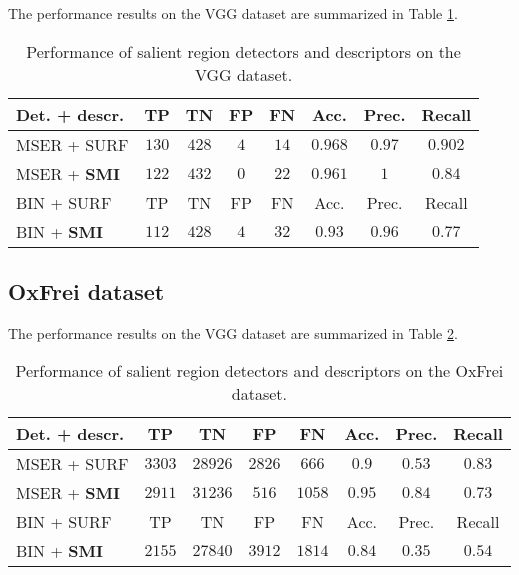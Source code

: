 \documentclass[a4paper,11pt]{article}
\begin{document}
The performance results on the VGG dataset are summarized in Table \ref{tab:vgg}.
\begin{table}[!ht]
\begin{center}
\begin{tabular}{|l||c|c|c|c|c|c|c|}

\hline
Det. + descr. & TP & TN & FP & FN & Acc. &Prec. &Recall\\
\hline
\hline
MSER + SURF & $130$ & $428$ & $4$ & $14$ & $0.968$ & $0.97$ & $0.902$\\
\hline
MSER + \bf{SMI} & $122$ & $432$ & $0$ & $22$ & $0.961$ & $1$ & $0.84$\\
\hline
BIN + SURF & TP & TN & FP & FN & Acc. &Prec. &Recall\\
\hline
BIN + \bf{SMI} & $112$ & $428$ & $4$ & $32$ & $0.93$ & $0.96$ & $0.77$\\
\hline
\end{tabular}
\end{center}
\vspace{-20pt}
\caption{Performance of salient region detectors and descriptors on the VGG dataset.} \label{tab:vgg}
  \vspace{-10pt}
\end{table}

\subsection{OxFrei dataset}

The performance results on the VGG dataset are summarized in Table \ref{tab:oxfrei}.
\begin{table}[!ht]
\begin{center}
\begin{tabular}{|l||c|c|c|c|c|c|c|}

\hline
Det. + descr. & TP & TN & FP & FN & Acc. &Prec. &Recall\\
\hline
\hline
MSER + SURF & $3303$ & $28926$ & $2826$ & $666$ & $0.9$ & $0.53$ & $0.83$\\
\hline
MSER + \bf{SMI} & $2911$ & $31236$ & $516$ & $1058$ & $0.95$ & $0.84$ & $0.73$\\
\hline
BIN + SURF & TP & TN & FP & FN & Acc. &Prec. &Recall\\
\hline
BIN + \bf{SMI}  & $2155$ & $27840$ & $3912$ & $1814$ & $0.84$ & $0.35$ & $0.54$\\
\hline
\end{tabular}
\end{center}
\vspace{-20pt}
\caption{Performance of salient region detectors and descriptors on the OxFrei dataset.} \label{tab:oxfrei}
  \vspace{-10pt}
\end{table}
\end{document}
